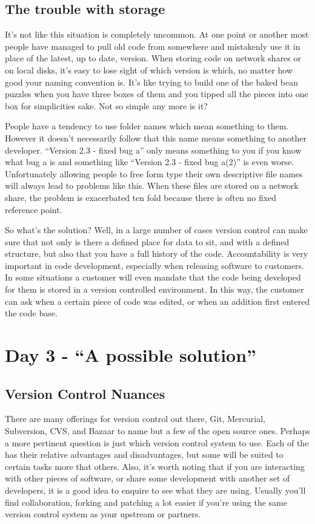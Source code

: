 \subsection*{The trouble with storage}

It's not like this situation is completely uncommon.  At one point or another most people have managed to pull old code from somewhere and mistakenly use it in place of the latest, up to date, version.  When storing code on network shares or on local disks, it's easy to lose sight of which version is which, no matter how good your naming convention is.  It's like trying to build one of the baked bean puzzles when you have three boxes of them and you tipped all the pieces into one box for simplicities sake.  Not so simple any more is it?

People have a tendency to use folder names which mean something to them.  However it doesn't necessarily follow that this name means something to another developer.  ``Version 2.3 - fixed bug a'' only means something to you if you know what bug a is and something like ``Version 2.3 - fixed bug a(2)'' is even worse.  Unfortunately allowing people to free form type their own descriptive file names will always lead to problems like this.  When these files are stored on a network share, the problem is exacerbated ten fold because there is often no fixed reference point.

So what's the solution?  Well, in a large number of cases version control can make sure that not only is there a defined place for data to sit, and with a defined structure, but also that you have a full history of the code.  Accountability is very important in code development, especially when releasing software to customers.  In some situations a customer will even mandate that the code being developed for them is stored in a version controlled environment.  In this way, the customer can ask when a certain piece of code was edited, or when an addition first entered the code base.

\section*{Day 3 - ``A possible solution''}
\subsection*{Version Control Nuances}

There are many offerings for version control out there, Git, Mercurial, Subversion, CVS, and Bazaar to name but a few of the open source ones.  Perhaps a more pertinent question is just which version control system to use.  Each of the has their relative advantages and disadvantages, but some will be suited to certain tasks more that others.  Also, it's worth noting that if you are interacting with other pieces of software, or share some development with another set of developers, it is a good idea to enquire to see what they are using.  Usually you'll find collaboration, forking and patching a lot easier if you're using the same version control system as your upstream or partners.

